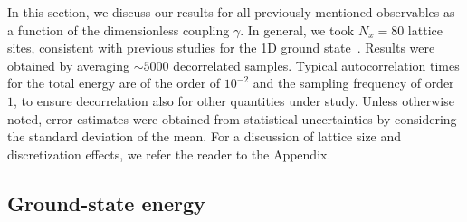\documentclass[pra,aps,groupedaddress,floatfix,twocolumn,superscriptaddress,showpacs,nofootinbib]{revtex4-1}
\begin{document}
{{In this section,  we
discuss our results for all previously mentioned observables
as a function of the dimensionless coupling $\gamma$.
In general, we} took $N_x^{} = 80$ lattice sites, consistent with previous
studies for the 1D ground
state~\cite{GCS1D}. Results were obtained by averaging $\sim 5000$ decorrelated samples{. Typical autocorrelation times for the total energy are of the order of $10^{-2}$ and the sampling frequency of order $1$, to ensure decorrelation also for other quantities under study. Unless otherwise noted, error estimates were}
obtained from statistical uncertainties by considering the standard deviation of the mean.}
For a discussion of lattice size and discretization effects, we refer the reader to the Appendix.

\subsection{Ground-state energy}\label{subsec:gse}
%
\end{document}
